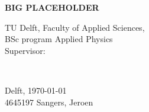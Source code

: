 \begin{titlepage}

\newcommand{\HRule}{\rule{\linewidth}{0.5mm}} %

\center


{ \huge \bfseries BIG PLACEHOLDER }\\[1cm] %






\vfill
\begin{minipage}{0.4\textwidth}
    \begin{flushleft}
        TU Delft, Faculty of Applied Sciences,\\
        BSc program Applied Physics \\
        Supervisor:
    \end{flushleft}
\end{minipage}
~
\begin{minipage}{0.4\textwidth}
    \begin{flushright}
        Delft, \today \\
        4645197 \hspace{1cm} Sangers, Jeroen
        
    \end{flushright}
\end{minipage}\\[1.5cm]


\end{titlepage}
